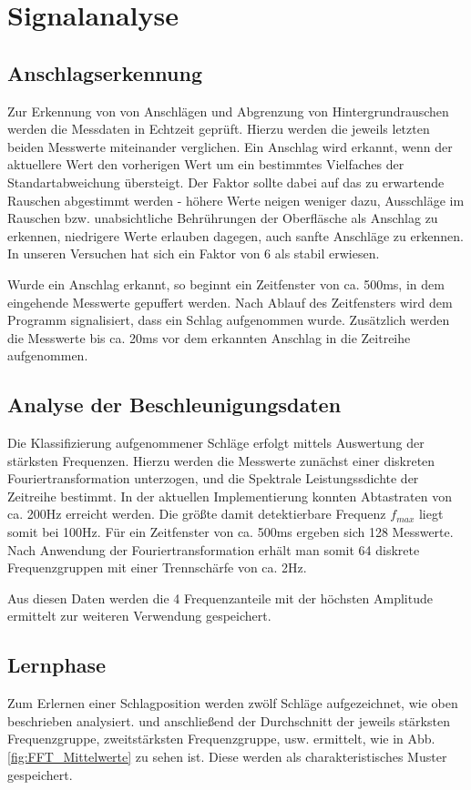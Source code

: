\section*{Signalanalyse}
\label{sec:Signalanalyse}
\subsection*{Anschlagserkennung}
Zur Erkennung von von Anschlägen und Abgrenzung von Hintergrundrauschen werden die Messdaten in Echtzeit geprüft. Hierzu werden die jeweils letzten beiden Messwerte miteinander verglichen. Ein Anschlag wird erkannt, wenn der aktuellere Wert den vorherigen Wert um ein bestimmtes Vielfaches der Standartabweichung übersteigt. Der Faktor sollte dabei auf das zu erwartende Rauschen abgestimmt werden - höhere Werte neigen weniger dazu, Ausschläge im Rauschen bzw. unabsichtliche Behrührungen der Oberfläsche als Anschlag zu erkennen, niedrigere Werte erlauben dagegen, auch sanfte Anschläge zu erkennen. In unseren Versuchen hat sich ein Faktor von 6 als stabil erwiesen.

Wurde ein Anschlag erkannt, so beginnt ein Zeitfenster von ca. 500ms, in dem eingehende Messwerte gepuffert werden. Nach Ablauf des Zeitfensters wird dem Programm signalisiert, dass ein Schlag aufgenommen wurde. Zusätzlich werden die Messwerte bis ca. 20ms vor dem erkannten Anschlag in die Zeitreihe aufgenommen.

\subsection*{Analyse der Beschleunigungsdaten}
Die Klassifizierung aufgenommener Schläge erfolgt mittels Auswertung der stärksten Frequenzen. Hierzu werden die Messwerte zunächst einer diskreten Fouriertransformation unterzogen, und die Spektrale Leistungssdichte der Zeitreihe bestimmt.
In der aktuellen Implementierung konnten Abtastraten von ca. 200Hz erreicht werden. Die größte damit detektierbare Frequenz $f_{max}$ liegt somit bei 100Hz.
Für ein Zeitfenster von ca. 500ms ergeben sich 128 Messwerte.
Nach Anwendung der Fouriertransformation erhält man somit 64 diskrete Frequenzgruppen mit einer Trennschärfe von ca. 2Hz.

Aus diesen Daten werden die 4 Frequenzanteile mit der höchsten Amplitude ermittelt zur weiteren Verwendung gespeichert.

\subsection*{Lernphase}
Zum Erlernen einer Schlagposition werden zwölf Schläge aufgezeichnet, wie oben beschrieben analysiert. und anschließend der Durchschnitt der jeweils stärksten Frequenzgruppe, zweitstärksten Frequenzgruppe, usw. ermittelt, wie in Abb. \ref{fig:FFT_Mittelwerte} zu sehen ist. Diese werden als charakteristisches Muster gespeichert.

